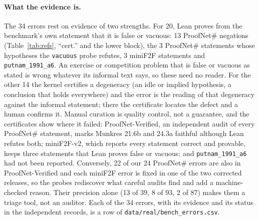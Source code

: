 \documentclass[10pt]{article}
\theoremstyle{definition}
\begin{document}
\paragraph{What the evidence is.} The 34 errors rest on evidence of two strengths. For 20, Lean
proves from the benchmark's own statement that it is false or vacuous: 13 ProofNet\# negations
(Table~\ref{tab:refs}, ``cert.'' and the lower block), the 3 ProofNet\# statements whose
hypotheses the \texttt{vacuous} probe refutes, 3 miniF2F statements and
\texttt{putnam\_1991\_a6}. An exercise or competition problem that is false or vacuous as stated
is wrong whatever its informal text says, so these need no reader. For the other 14 the kernel
certifies a degeneracy (an idle or implied hypothesis, a conclusion that holds everywhere) and
the error is the reading of that degeneracy against the informal statement; there the
certificate locates the defect and a human confirms it. Manual curation is quality control, not
a guarantee, and the certificates show where it failed: ProofNet-Verified, an independent audit
of every ProofNet\# statement, marks Munkres 21.6b and 24.3a faithful although Lean refutes
both; miniF2F-v2, which reports every statement correct and provable, keeps three statements
that Lean proves false or vacuous; and \texttt{putnam\_1991\_a6} had not been reported. Conversely,
22 of our 24 ProofNet\# errors are also in ProofNet-Verified and each miniF2F error is fixed in
one of the two corrected releases, so the probes rediscover what careful audits find and add a
machine-checked reason. Their precision alone (13 of 39, 8 of 93, 2 of 87) makes them a triage
tool, not an auditor. Each of the 34 errors, with its evidence and its status in the independent
records, is a row of \texttt{data/real/bench\_errors.csv}.
\end{document}

